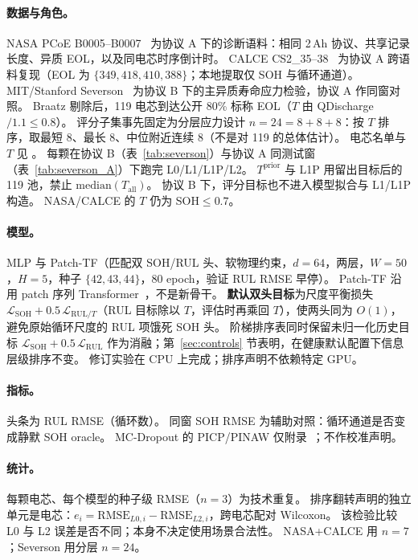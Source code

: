 \documentclass[UTF8,a4paper,12pt]{ctexart}
\begin{document}
\paragraph{数据与角色。}
NASA PCoE B0005--B0007~\cite{saha2007nasa} 为协议 A 下的诊断语料：相同 2\,Ah 协议、共享记录长度、异质 EOL，以及同电芯时序倒计时。
CALCE CS2\_35--38~\cite{he2011calce} 为协议 A 跨语料复现（EOL 为 $\{349,418,410,388\}$；本地提取仅 SOH 与循环通道）。
MIT/Stanford Severson~\cite{severson2019nature} 为协议 B 下的主异质寿命应力检验，协议 A 作同窗对照。
Braatz 剔除后，119 电芯到达公开 80\% 标称 EOL（$T$ 由 QDischarge$/1.1\le 0.8$）。
评分子集事先固定为分层应力设计 $n{=}24{=}8{+}8{+}8$：按 $T$ 排序，取最短 8、最长 8、中位附近连续 8（不是对 119 的总体估计）。
电芯名单与 $T$ 见 。
每颗在协议 B（表~\ref{tab:severson}）与协议 A 同测试窗（表~\ref{tab:severson_A}）下跑完 L0/L1/L1P/L2。
$T^{\mathrm{prior}}$ 与 L1P 用留出目标后的 119 池，禁止 $\mathrm{median}(T_{\mathrm{all}})$。
协议 B 下，评分目标也不进入模型拟合与 L1/L1P 构造。
NASA/CALCE 的 $T$ 仍为 SOH$\le 0.7$。

\paragraph{模型。}
MLP 与 Patch-TF（匹配双 SOH/RUL 头、软物理约束，$d{=}64$，两层，$W{=}50$，$H{=}5$，种子 $\{42,43,44\}$，80 epoch，验证 RUL RMSE 早停）。
Patch-TF 沿用 patch 序列 Transformer~\cite{vaswani2017,nie2023patchtst}，不是新骨干。
\textbf{默认双头目标}为尺度平衡损失 $\mathcal{L}_{\mathrm{SOH}}+0.5\,\mathcal{L}_{\mathrm{RUL}/T}$（RUL 目标除以 $T$，评估时再乘回 $T$），使两头同为 $O(1)$，避免原始循环尺度的 RUL 项饿死 SOH 头。
阶梯排序表同时保留未归一化历史目标 $\mathcal{L}_{\mathrm{SOH}}+0.5\,\mathcal{L}_{\mathrm{RUL}}$ 作为消融；第~\ref{sec:controls} 节表明，在健康默认配置下信息层级排序不变。
修订实验在 CPU 上完成；排序声明不依赖特定 GPU。

\paragraph{指标。}
头条为 RUL RMSE（循环数）。
同窗 SOH RMSE 为辅助对照：循环通道是否变成静默 SOH oracle。
MC-Dropout 的 PICP/PINAW 仅附录~\cite{gal2016}；不作校准声明。

\paragraph{统计。}
每颗电芯、每个模型的种子级 RMSE（$n{=}3$）为技术重复。
排序翻转声明的独立单元是电芯：$e_i=\mathrm{RMSE}_{L0,i}-\mathrm{RMSE}_{L2,i}$，跨电芯配对 Wilcoxon。
该检验比较 L0 与 L2 误差是否不同；本身不决定使用场景合法性。
NASA+CALCE 用 $n{=}7$；Severson 用分层 $n{=}24$。
\end{document}

